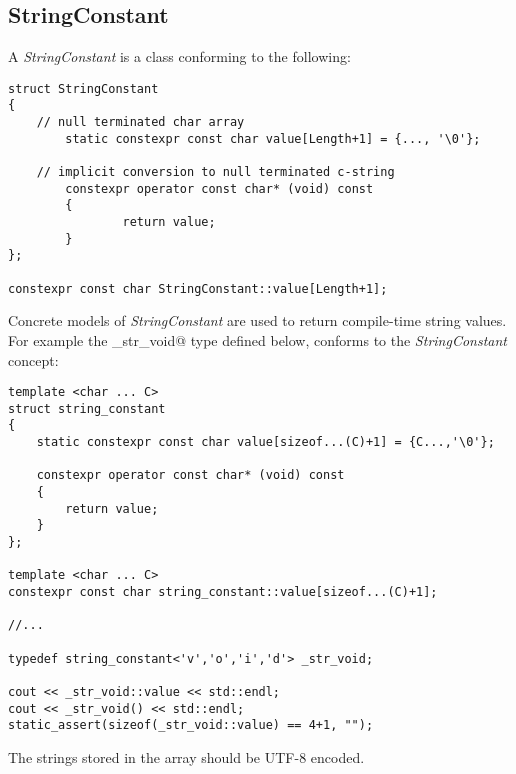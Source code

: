 \subsection{StringConstant}
\label{concept-StringConstant}

A {\em StringConstant} is a class conforming to the following:

\begin{lstlisting}
struct StringConstant
{
	// null terminated char array
        static constexpr const char value[Length+1] = {..., '\0'};

	// implicit conversion to null terminated c-string
        constexpr operator const char* (void) const
        {
                return value;
        }
};

constexpr const char StringConstant::value[Length+1];
\end{lstlisting}

Concrete models of {\em StringConstant} are used to return compile-time string values.
For example the \verb@_str_void@ type defined below, conforms to the {\em StringConstant}
concept:

\begin{lstlisting}
template <char ... C>
struct string_constant
{
	static constexpr const char value[sizeof...(C)+1] = {C...,'\0'};

	constexpr operator const char* (void) const
	{
		return value;
	}
};

template <char ... C>
constexpr const char string_constant::value[sizeof...(C)+1];

//...

typedef string_constant<'v','o','i','d'> _str_void;

cout << _str_void::value << std::endl;
cout << _str_void() << std::endl;
static_assert(sizeof(_str_void::value) == 4+1, "");
\end{lstlisting}

The strings stored in the \verb@value@ array should be UTF-8 encoded.
